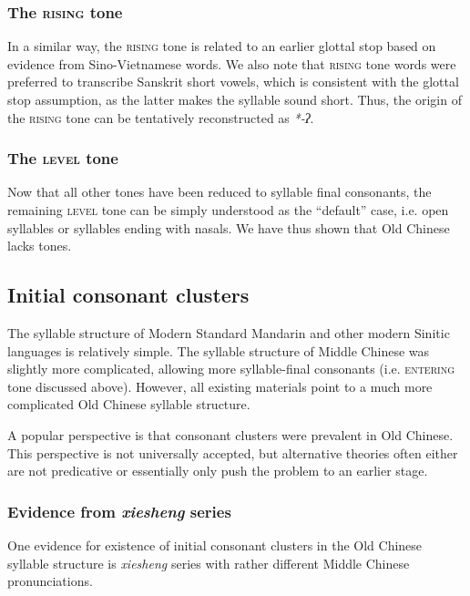 \documentclass[UTF8, a4paper, oneside, scheme=plain, 12pt]{ctexrep}
\newcommand{\form}[1]{\emph{#1}}
\newcommand*{\category}[1]{\textsc{#1}}
\begin{document}
\subsubsection{The \category{rising} tone}

In a similar way, the \category{rising} tone is related to an earlier glottal stop
based on evidence from Sino-Vietnamese words.
We also note that \category{rising} tone words were preferred
to transcribe Sanskrit short vowels,
which is consistent with the glottal stop assumption,
as the latter makes the syllable sound short.
Thus, the origin of the \category{rising} tone can be tentatively reconstructed as \form{*-ʔ}.

\subsubsection{The \category{level} tone}

Now that all other tones have been reduced to syllable final consonants,
the remaining \category{level} tone can be simply understood as the ``default'' case,
i.e. open syllables or syllables ending with nasals.
We have thus shown that Old Chinese lacks tones.

\subsection{Initial consonant clusters}\label{sec:intro.prehistory.reconstruction.initial-consonant-cluster}

The syllable structure of Modern Standard Mandarin and other modern Sinitic languages is relatively simple.
The syllable structure of Middle Chinese was slightly more complicated, allowing more syllable-final consonants (i.e. \category{entering} tone discussed above).
However, all existing materials point to a much more complicated Old Chinese syllable structure.

A popular perspective is that consonant clusters were prevalent in Old Chinese.
This perspective is not universally accepted,
but alternative theories often either are not predicative or essentially only push the problem to an earlier stage.

\subsubsection{Evidence from \form{xiesheng} series}

One evidence for existence of initial consonant clusters in the Old Chinese syllable structure is \form{xiesheng} series with rather different Middle Chinese pronunciations.
\end{document}
